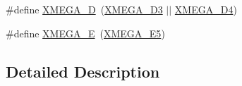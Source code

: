 \begin{DoxyCompactItemize}
\item 
\#define \hyperlink{group__xmega__part__macros__group_gacc9e4b074c3f87ce7b461483b0beb15c}{X\-M\-E\-G\-A\-\_\-\-D}~(\hyperlink{group__xmega__part__macros__group_gad634208a506f79622c67be500014feb3}{X\-M\-E\-G\-A\-\_\-\-D3} $|$$|$ \hyperlink{group__xmega__part__macros__group_ga831e633408c7458a445d333b9b3f142f}{X\-M\-E\-G\-A\-\_\-\-D4})
\item 
\#define \hyperlink{group__xmega__part__macros__group_gaab6d2543c5128fca0b1aeecb5c080723}{X\-M\-E\-G\-A\-\_\-\-E}~(\hyperlink{group__xmega__part__macros__group_ga3bbcf2e955c9747a3595f8cdc01436ba}{X\-M\-E\-G\-A\-\_\-\-E5})
\end{DoxyCompactItemize}


\subsection{Detailed Description}


